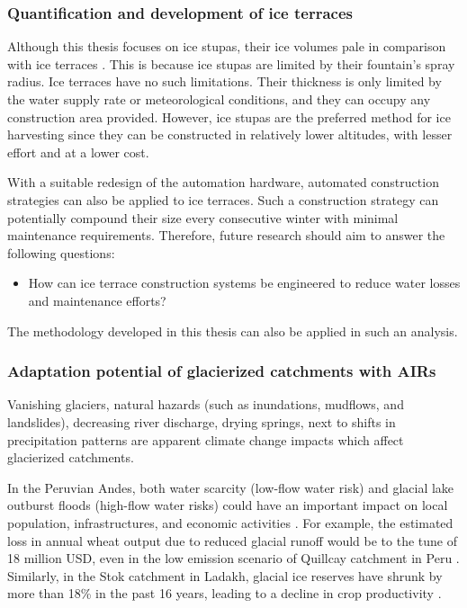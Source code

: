 \subsubsection{Quantification and development of ice terraces}

Although this thesis focuses on ice stupas, their ice volumes pale in comparison with ice terraces
\citep{nusserSociohydrologyArtificialGlaciers2019}. This is because ice stupas are limited by their fountain's
spray radius. Ice terraces have no such limitations. Their thickness is only limited by the water supply rate or
meteorological conditions, and they can occupy any construction area provided. However, ice stupas are the
preferred method for ice harvesting since they can be constructed in relatively lower altitudes, with lesser
effort and at a lower cost.

With a suitable redesign of the automation hardware, automated construction strategies can also be applied to
ice terraces. Such a construction strategy can potentially compound their size every consecutive winter with
minimal maintenance requirements. Therefore, future research should aim to answer the following questions:

\begin{itemize}

	\item How can ice terrace construction systems be engineered to reduce water losses and maintenance
	      efforts?

\end{itemize}

The methodology developed in this thesis can also be applied in such an analysis.

\subsubsection{Adaptation potential of glacierized catchments with AIRs}

Vanishing glaciers, natural hazards (such as inundations, mudflows, and landslides), decreasing river discharge,
drying springs, next to shifts in precipitation patterns are apparent climate change impacts which affect
glacierized catchments.

In the Peruvian Andes, both water scarcity (low-flow water risk) and glacial lake outburst floods (high-flow
water risks) could have an important impact on local population, infrastructures, and economic activities
\citep{motschmannIntegratedAssessmentsWater2020}. For example, the estimated loss in annual wheat output due to
reduced glacial runoff would be to the tune of 18 million USD, even in the low emission scenario of Quillcay
catchment in Peru \citep{motschmannLossesDamagesConnected2020}. Similarly, in the Stok catchment in Ladakh,
glacial ice reserves have shrunk by more than 18\% in the past 16 years, leading to a decline in crop
productivity \citep{sohebSpatiotemporalQuantificationKey2022}.

